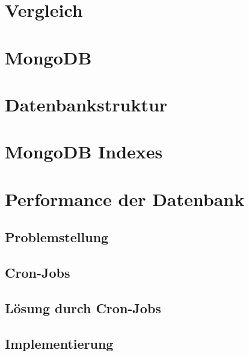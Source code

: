 \section{Vergleich}
\lipsum[1-2]

\section{MongoDB}
\lipsum[1-2]

\section{Datenbankstruktur}
\lipsum[1-2]

\section{MongoDB Indexes}
\lipsum[1-2]

\section{Performance der Datenbank}
\lipsum[1-2]

\subsection{Problemstellung}
\lipsum[1-2]

\subsection{Cron-Jobs}
\lipsum[1-2]

\subsection{Lösung durch Cron-Jobs}
\lipsum[1-2]

\subsection{Implementierung}
\lipsum[1-2]